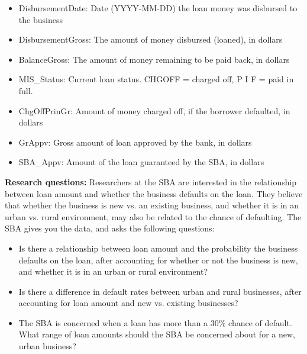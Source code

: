 \documentclass[11pt]{article}
\begin{document}
\begin{itemize}
\item DisbursementDate: 	Date (YYYY-MM-DD) the loan money was disbursed to the business
\item DisbursementGross:	The amount of money disbursed (loaned), in dollars
\item BalanceGross: 	The amount of money remaining to be paid back, in dollars
\item MIS\_Status: 	Current loan status. CHGOFF = charged off, P I F = paid in full.
\item ChgOffPrinGr: 	Amount of money charged off, if the borrower defaulted, in dollars
\item GrAppv: 	Gross amount of loan approved by the bank, in dollars
\item SBA\_Appv: 	Amount of the loan guaranteed by the SBA, in dollars 
\end{itemize}

\noindent \textbf{Research questions:} Researchers at the SBA are interested in the relationship between loan amount and whether the business defaults on the loan. They believe that whether the business is new vs. an existing business, and whether it is in an urban vs. rural environment, may also be related to the chance of defaulting. The SBA gives you the data, and asks the following questions:
\begin{itemize}
\item Is there a relationship between loan amount and the probability the business defaults on the loan, after accounting for whether or not the business is new, and whether it is in an urban or rural environment?
\item Is there a difference in default rates between urban and rural businesses, after accounting for loan amount and new vs. existing businesses?
\item The SBA is concerned when a loan has more than a 30\% chance of default. What range of loan amounts should the SBA be concerned about for a new, urban business?
\end{itemize}
\end{document}
